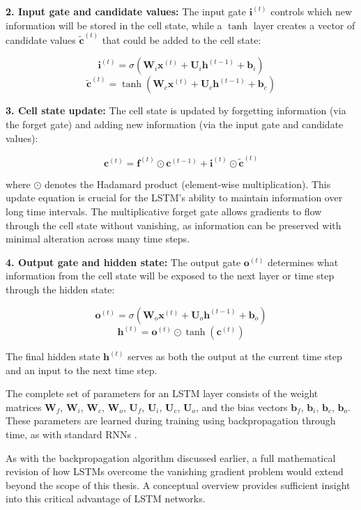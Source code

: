 \textbf{2. Input gate and candidate values:} The input gate \(\mathbf{i}^{(t)}\) controls which new information will be stored in the cell state, while a \(\tanh\) layer creates a vector of candidate values \(\mathbf{\tilde{c}}^{(t)}\) that could be added to the cell state:

\[
  \mathbf{i}^{(t)} = \sigma(\mathbf{W}_i\mathbf{x}^{(t)} + \mathbf{U}_i\mathbf{h}^{(t-1)} + \mathbf{b}_i)
\]
\[
  \mathbf{\tilde{c}}^{(t)} = \tanh(\mathbf{W}_c\mathbf{x}^{(t)} + \mathbf{U}_c\mathbf{h}^{(t-1)} + \mathbf{b}_c)
\]

\textbf{3. Cell state update:} The cell state is updated by forgetting information (via the forget gate) and adding new information (via the input gate and candidate values):

\[
  \mathbf{c}^{(t)} = \mathbf{f}^{(t)} \odot \mathbf{c}^{(t-1)} + \mathbf{i}^{(t)} \odot \mathbf{\tilde{c}}^{(t)}
\]

where \(\odot\) denotes the Hadamard product (element-wise multiplication). This update equation is crucial for the LSTM's ability to maintain information over long time intervals. The multiplicative forget gate allows gradients to flow through the cell state without vanishing, as information can be preserved with minimal alteration across many time steps.

\textbf{4. Output gate and hidden state:} The output gate \(\mathbf{o}^{(t)}\) determines what information from the cell state will be exposed to the next layer or time step through the hidden state:

\[
  \mathbf{o}^{(t)} = \sigma(\mathbf{W}_o\mathbf{x}^{(t)} + \mathbf{U}_o\mathbf{h}^{(t-1)} + \mathbf{b}_o)
\]
\[
  \mathbf{h}^{(t)} = \mathbf{o}^{(t)} \odot \tanh(\mathbf{c}^{(t)})
\]

The final hidden state \(\mathbf{h}^{(t)}\) serves as both the output at the current time step and an input to the next time step.

The complete set of parameters for an LSTM layer consists of the weight matrices \(\mathbf{W}_f\), \(\mathbf{W}_i\), \(\mathbf{W}_c\), \(\mathbf{W}_o\), \(\mathbf{U}_f\), \(\mathbf{U}_i\), \(\mathbf{U}_c\), \(\mathbf{U}_o\), and the bias vectors \(\mathbf{b}_f\), \(\mathbf{b}_i\), \(\mathbf{b}_c\), \(\mathbf{b}_o\). These parameters are learned during training using backpropagation through time, as with standard RNNs \parencite{goodfellow2016}.

As with the backpropagation algorithm discussed earlier, a full mathematical revision of how LSTMs overcome the vanishing gradient problem would extend beyond the scope of this thesis. A conceptual overview provides sufficient insight into this critical advantage of LSTM networks.

